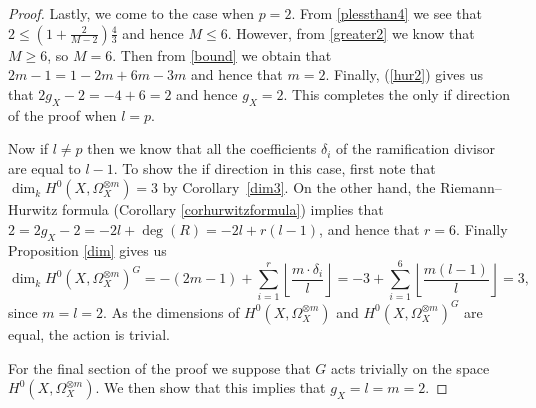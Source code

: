 \begin{proof}
    Lastly, we come to the case when $p=2$. From \eqref{plessthan4} we see that $2\leq \left(1+\frac{2}{M-2}\right)\frac{4}{3}$ 
    and hence $M\leq 6$. However, from \eqref{greater2} we know that $M\geq 6$, so $M=6$. Then from \eqref{bound}  we obtain that $2m-1=1-2m+6m-3m$
    and hence that $m=2$. Finally, (\ref{hur2}) gives us that $2g_X-2=-4+6=2$ and hence $g_X=2$. 
    This completes the only if direction of the proof when $l=p$.
    
    Now if $l\neq p$ then we know that all the coefficients $\delta_i$ of the ramification divisor are equal to $l-1$. 
    To show the if direction in this case, first note that $\dim_kH^0(X,\Omega_X^{\otimes m})=3$ by Corollary~\ref{dim3}. 
    On the other hand, the Riemann--Hurwitz formula (Corollary \ref{corhurwitzformula}) implies that $2 = 2g_X-2=-2l+\deg(R)=-2l+r(l-1)$, and hence that $r=6$. 
    Finally Proposition \ref{dim} gives us
        \begin{equation*}
        \dim_kH^0(X,\Omega_X^{\otimes m})^G = -(2m-1) + \sum_{i=1}^r \left\lfloor \frac{m\cdot \delta_i}{l} \right\rfloor
        = -3 +\sum_{i=1}^6 \left\lfloor \frac{m(l-1)}{l} \right\rfloor
        = 3,
        \end{equation*}
    since $m=l=2$.
    As the dimensions of $H^0(X,\Omega_X^{\otimes m})$ and $H^0(X,\Omega_X^{\otimes m})^G$ are equal, the action is trivial.
    
    
    For the final section of the proof we suppose that $G$ acts trivially on the space $H^0(X,\Omega_X^{\otimes m})$.
    We then show that this implies that $g_X=l=m=2$.
    

\end{proof}
